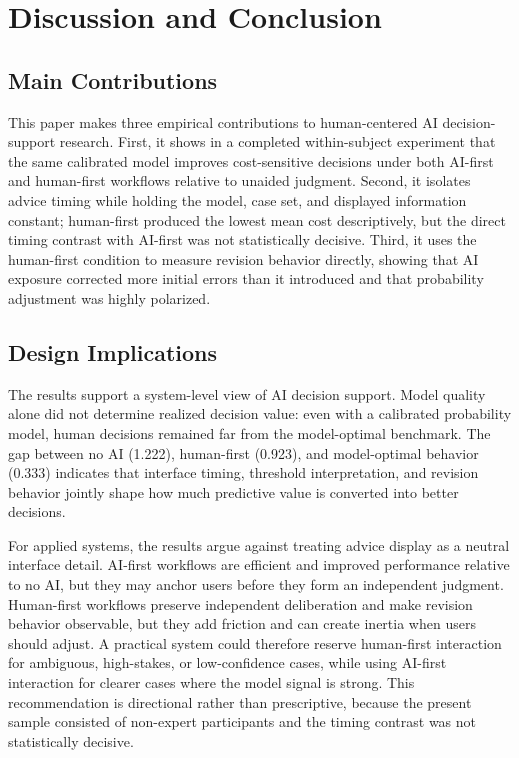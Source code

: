 \documentclass[conference]{IEEEtran}
\begin{document}
\section{Discussion and Conclusion}
\label{sec:discussion}

\subsection{Main Contributions}

This paper makes three empirical contributions to human-centered AI
decision-support research. First, it shows in a completed within-subject
experiment that the same calibrated model improves cost-sensitive
decisions under both AI-first and human-first workflows relative to
unaided judgment. Second, it isolates advice timing while holding the
model, case set, and displayed information constant; human-first produced
the lowest mean cost descriptively, but the direct timing contrast with
AI-first was not statistically decisive. Third, it uses the human-first
condition to measure revision behavior directly, showing that AI exposure
corrected more initial errors than it introduced and that probability
adjustment was highly polarized.

\subsection{Design Implications}

The results support a system-level view of AI decision support. Model
quality alone did not determine realized decision value: even with a
calibrated probability model, human decisions remained far from the
model-optimal benchmark. The gap between no AI (1.222), human-first
(0.923), and model-optimal behavior (0.333) indicates that interface
timing, threshold interpretation, and revision behavior jointly shape how
much predictive value is converted into better decisions.

For applied systems, the results argue against treating advice display as
a neutral interface detail. AI-first workflows are efficient and improved
performance relative to no AI, but they may anchor users before they form
an independent judgment. Human-first workflows preserve independent
deliberation and make revision behavior observable, but they add friction
and can create inertia when users should adjust. A practical system could
therefore reserve human-first interaction for ambiguous, high-stakes, or
low-confidence cases, while using AI-first interaction for clearer cases
where the model signal is strong. This recommendation is directional
rather than prescriptive, because the present sample consisted of
non-expert participants and the timing contrast was not statistically
decisive.
\end{document}
